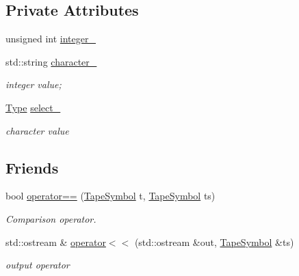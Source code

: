 \subsection*{\-Private \-Attributes}
\begin{DoxyCompactItemize}
\item 
unsigned int \hyperlink{classTM_1_1TapeSymbol_a09b69817f96736cc1f958d6c2d2aa2b0}{integer\-\_\-}
\item 
std\-::string \hyperlink{classTM_1_1TapeSymbol_a86066d23f5c51d788d039ccc50aa44a6}{character\-\_\-}
\begin{DoxyCompactList}\small\item\em integer value; \end{DoxyCompactList}\item 
\hyperlink{namespaceTM_ac5907d46a678a9a9fe237dce1768dbad}{\-Type} \hyperlink{classTM_1_1TapeSymbol_af84d020bd2a06906fc7bb461cf16fb14}{select\-\_\-}
\begin{DoxyCompactList}\small\item\em character value \end{DoxyCompactList}\end{DoxyCompactItemize}
\subsection*{\-Friends}
\begin{DoxyCompactItemize}
\item 
bool \hyperlink{classTM_1_1TapeSymbol_a0eb718edb9457b586f4e200b7eddfdf3}{operator==} (\hyperlink{classTM_1_1TapeSymbol}{\-Tape\-Symbol} t, \hyperlink{classTM_1_1TapeSymbol}{\-Tape\-Symbol} ts)
\begin{DoxyCompactList}\small\item\em \-Comparison operator. \end{DoxyCompactList}\item 
std\-::ostream \& \hyperlink{classTM_1_1TapeSymbol_ae2fd50d93deb1efc1b7e831b8ec43d8c}{operator$<$$<$} (std\-::ostream \&out, \hyperlink{classTM_1_1TapeSymbol}{\-Tape\-Symbol} \&ts)
\begin{DoxyCompactList}\small\item\em output operator \end{DoxyCompactList}\end{DoxyCompactItemize}



